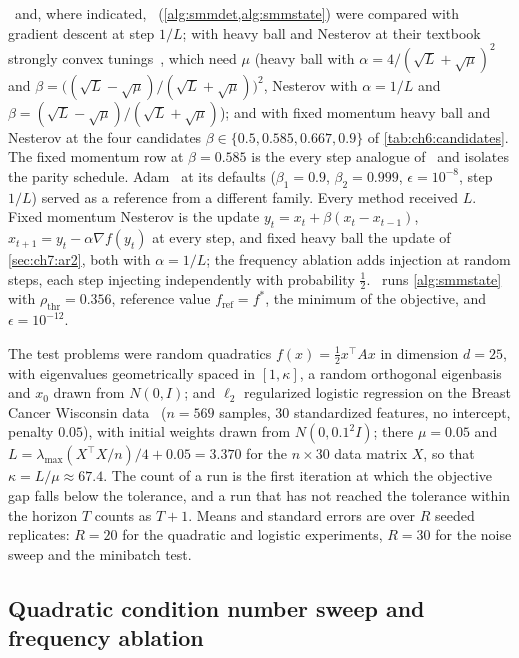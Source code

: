 \smmdet\ and, where indicated, \smmstate\ (\cref{alg:smmdet,alg:smmstate}) were
compared with gradient descent at step $1/L$; with heavy ball and Nesterov at
their textbook strongly convex tunings~\cite{polyak1987,nesterov2004}, which
need $\mu$ (heavy ball with $\alpha=4/(\sqrt L+\sqrt\mu)^2$ and
$\beta=\bigl((\sqrt L-\sqrt\mu)/(\sqrt L+\sqrt\mu)\bigr)^2$, Nesterov with
$\alpha=1/L$ and $\beta=(\sqrt L-\sqrt\mu)/(\sqrt L+\sqrt\mu)$); and with fixed
momentum heavy ball and Nesterov at the four candidates
$\beta\in\{0.5,0.585,0.667,0.9\}$ of \cref{tab:ch6:candidates}. The fixed
momentum row at $\beta=0.585$ is the every step analogue of \smmdet\ and
isolates the parity schedule. Adam~\cite{kingma2015} at its defaults
($\beta_1=0.9$, $\beta_2=0.999$, $\epsilon=10^{-8}$, step $1/L$) served as a
reference from a different family. Every method received $L$.
Fixed momentum Nesterov is the update $y_t=x_t+\beta(x_t-x_{t-1})$, $x_{t+1}=y_t-\alpha\nabla f(y_t)$ at every step, and fixed heavy ball the update of \cref{sec:ch7:ar2}, both with $\alpha=1/L$; the frequency ablation adds injection at random steps, each step injecting independently with probability $\tfrac12$. \smmstate\ runs \cref{alg:smmstate} with $\rho_{\mathrm{thr}}=0.356$, reference value $f_{\mathrm{ref}}=f^\ast$, the minimum of the objective, and $\epsilon=10^{-12}$.

The test problems were random quadratics $f(x)=\tfrac12x^\top Ax$ in dimension $d=25$, with eigenvalues geometrically spaced in $[1,\kappa]$, a random orthogonal eigenbasis and $x_0$ drawn from $N(0,I)$; and $\ell_2$ regularized logistic regression on the Breast Cancer Wisconsin data~\cite{wolberg1995} ($n=569$ samples, $30$ standardized features, no intercept, penalty $0.05$), with initial weights drawn from $N(0,0.1^2I)$; there $\mu=0.05$ and $L=\lambda_{\max}(X^\top X/n)/4+0.05=3.370$ for the $n\times30$ data matrix $X$, so that $\kappa=L/\mu\approx67.4$. The count of a run is the first iteration at which the objective gap falls below the tolerance, and a run that has not reached the tolerance within the horizon $T$ counts as $T+1$. Means and standard errors are over $R$ seeded replicates: $R=20$ for the quadratic and logistic experiments, $R=30$ for the noise sweep and the minibatch test.

\subsection{Quadratic condition number sweep and frequency ablation}

